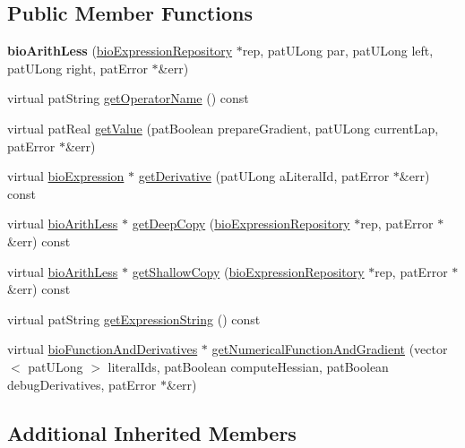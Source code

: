 \subsection*{Public Member Functions}
\begin{DoxyCompactItemize}
\item 
\mbox{\label{classbio_arith_less_a94229f67cdd192ea9524c94f51bbecb7}} 
{\bfseries bio\+Arith\+Less} (\hyperlink{classbio_expression_repository}{bio\+Expression\+Repository} $\ast$rep, pat\+U\+Long par, pat\+U\+Long left, pat\+U\+Long right, pat\+Error $\ast$\&err)
\item 
virtual pat\+String \hyperlink{classbio_arith_less_a0be270c31ac0cec7d6e23dfe9558a138}{get\+Operator\+Name} () const
\item 
virtual pat\+Real \hyperlink{classbio_arith_less_aa53cd0dfe26ec7e75b760661b940ac0d}{get\+Value} (pat\+Boolean prepare\+Gradient, pat\+U\+Long current\+Lap, pat\+Error $\ast$\&err)
\item 
virtual \hyperlink{classbio_expression}{bio\+Expression} $\ast$ \hyperlink{classbio_arith_less_a031bd542ab09a456fcdd4f4e121d2940}{get\+Derivative} (pat\+U\+Long a\+Literal\+Id, pat\+Error $\ast$\&err) const
\item 
virtual \hyperlink{classbio_arith_less}{bio\+Arith\+Less} $\ast$ \hyperlink{classbio_arith_less_a44f8cd0243ba7997d9799537c099c5a8}{get\+Deep\+Copy} (\hyperlink{classbio_expression_repository}{bio\+Expression\+Repository} $\ast$rep, pat\+Error $\ast$\&err) const
\item 
virtual \hyperlink{classbio_arith_less}{bio\+Arith\+Less} $\ast$ \hyperlink{classbio_arith_less_a186b89363273b2972ae1beb00a1efbb0}{get\+Shallow\+Copy} (\hyperlink{classbio_expression_repository}{bio\+Expression\+Repository} $\ast$rep, pat\+Error $\ast$\&err) const
\item 
virtual pat\+String \hyperlink{classbio_arith_less_a8f9d063a00ed8a65ea2b37e3d63405f8}{get\+Expression\+String} () const
\item 
virtual \hyperlink{classbio_function_and_derivatives}{bio\+Function\+And\+Derivatives} $\ast$ \hyperlink{classbio_arith_less_a03309258107a65a08f59b00878eec548}{get\+Numerical\+Function\+And\+Gradient} (vector$<$ pat\+U\+Long $>$ literal\+Ids, pat\+Boolean compute\+Hessian, pat\+Boolean debug\+Derivatives, pat\+Error $\ast$\&err)
\end{DoxyCompactItemize}
\subsection*{Additional Inherited Members}


